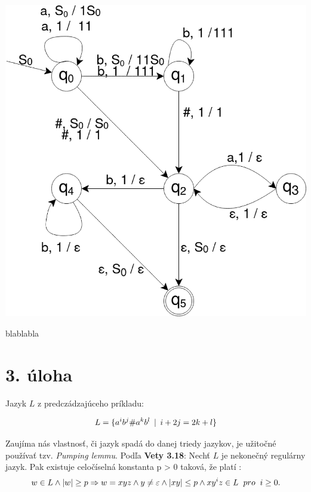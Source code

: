 \documentclass[11pt,a4paper]{article}
\begin{document}
\includegraphics[width=\textwidth]{QFSMpng.eps}

blablabla









\newpage
\section{3. úloha}

Jazyk $L$ z predczádzajúceho príkladu:

\begin{equation}
L = \{a^i b^j \# a^k b^l \hspace{0.17cm}|\hspace{0.17cm} i + 2j = 2k + l\}
\end{equation}

Zaujíma nás vlastnosť, či jazyk spadá do danej triedy jazykov, je užitočné používať tzv. \textit{Pumping lemmu}.
Podľa \textbf{Vety 3.18}: Nechť $L$ je nekonečný regulárny jazyk. Pak existuje celočíselná konstanta \hspace{1cm}p > 0 taková, že platí \cite{AA}:
\begin{equation}
w \in L \land  |w| \ge p \Rightarrow w = x y z \land y \ne \varepsilon \land |xy| \le p \land x y^i z \in L \hspace{0.2cm} pro\hspace{0.2cm} i \ge 0.
\end{equation}
\end{document}
